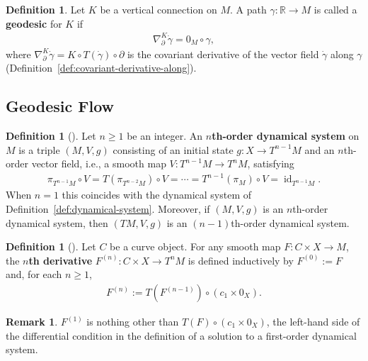 \documentclass{amsart}
\newcommand{\R}{\mathbb{R}}
\DeclareMathOperator{\id}{id}
\theoremstyle{definition}
\newtheorem{defn}[thm]{Definition}
\newtheorem{rem}[thm]{Remark}
\begin{document}
\begin{defn}\label{def:geodesic}
Let $K$ be a vertical connection on $M$.
A path $\gamma \colon \R \to M$ is called a \textbf{geodesic} for $K$ if
\begin{align*}
   \nabla^K_{\partial} \dot{\gamma} = 0_M \circ \gamma,
\end{align*}
where $\nabla^K_\partial \dot\gamma = K \circ T(\dot\gamma) \circ \partial$ is
the covariant derivative of the vector field $\dot\gamma$ along $\gamma$
(Definition~\ref{def:covariant-derivative-along}).
\end{defn}

\subsection{Geodesic Flow}\label{subsec:geodesic-flow}

\begin{defn}[{\cite[Definition~3.10]{CCL}}]\label{def:nth-order-dynamical-system}
  Let $n \geq 1$ be an integer.
  An \textbf{$n$th-order dynamical system} on $M$ is a triple
  $(M, V, g)$ consisting of an initial state $g \colon X \to T^{n-1}M$ and
  an $n$th-order vector field, i.e., a smooth map
  $V \colon T^{n-1}M \to T^nM$, satisfying
  \begin{align*}
      \pi_{T^{n-1}M} \circ V
        = T(\pi_{T^{n-2}M}) \circ V
        = \cdots
        = T^{n-1}(\pi_M) \circ V
        = \id_{T^{n-1}M}.
  \end{align*}
  When $n = 1$ this coincides with the dynamical system of
  Definition~\ref{def:dynamical-system}.
  Moreover, if $(M, V, g)$ is an $n$th-order dynamical system,
  then $(TM, V, g)$ is an $(n-1)$th-order dynamical system.
\end{defn}

\begin{defn}[{\cite[Definition~3.11]{CCL}}]\label{def:nth-derivative}
  Let $C$ be a curve object.
  For any smooth map $F \colon C \times X \to M$,
  the \textbf{$n$th derivative} $F^{(n)} \colon C \times X \to T^nM$ is
  defined inductively by $F^{(0)} := F$ and, for each $n \geq 1$,
  \begin{align*}
      F^{(n)} := T(F^{(n-1)}) \circ (c_1 \times 0_X).
  \end{align*}
\end{defn}

\begin{rem}\label{rem:first-derivative}
  $F^{(1)}$ is nothing other than $T(F) \circ (c_1 \times 0_X)$,
  the left-hand side of the differential condition
  in the definition of a solution to a first-order dynamical system.
\end{rem}
\end{document}
